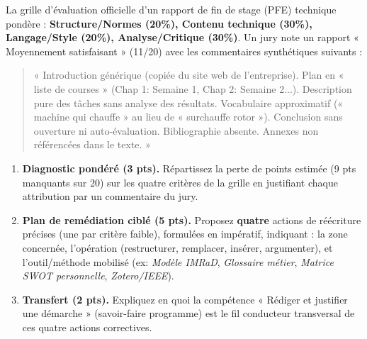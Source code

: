 \documentclass[11pt]{article}
\begin{document}
\begin{exercice}
\label{exo:remed}
La grille d'évaluation officielle d'un rapport de fin de stage (PFE) technique pondère : \textbf{Structure/Normes (20\%), Contenu technique (30\%), Langage/Style (20\%), Analyse/Critique (30\%)}. Un jury note un rapport « Moyennement satisfaisant » (11/20) avec les commentaires synthétiques suivants :
\begin{quote}
« Introduction générique (copiée du site web de l'entreprise). Plan en « liste de courses » (Chap 1: Semaine 1, Chap 2: Semaine 2...). Description pure des tâches sans analyse des résultats. Vocabulaire approximatif (« machine qui chauffe » au lieu de « surchauffe rotor »). Conclusion sans ouverture ni auto-évaluation. Bibliographie absente. Annexes non référencées dans le texte. »
\end{quote}

\begin{enumerate}
    \item \textbf{Diagnostic pondéré (3 pts).} Répartissez la perte de points estimée (9 pts manquants sur 20) sur les quatre critères de la grille en justifiant chaque attribution par un commentaire du jury.
    \item \textbf{Plan de remédiation ciblé (5 pts).} Proposez \textbf{quatre} actions de réécriture précises (une par critère faible), formulées en impératif, indiquant : la zone concernée, l'opération (restructurer, remplacer, insérer, argumenter), et l'outil/méthode mobilisé (ex: \textit{Modèle IMRaD}, \textit{Glossaire métier}, \textit{Matrice SWOT personnelle}, \textit{Zotero/IEEE}).
    \item \textbf{Transfert (2 pts).} Expliquez en quoi la compétence « Rédiger et justifier une démarche » (savoir-faire programme) est le fil conducteur transversal de ces quatre actions correctives.
\end{enumerate}
\end{exercice}
\end{document}
